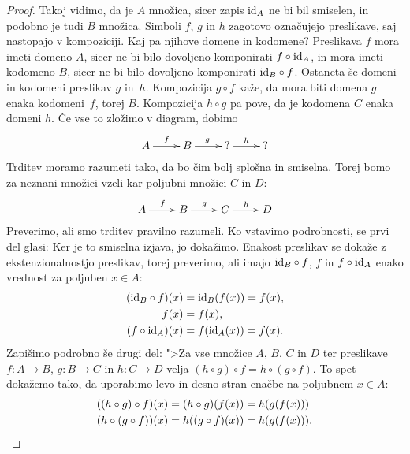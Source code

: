 \begin{proof}
  Takoj vidimo, da je $A$ množica, sicer zapis $\id[A]$ ne bi bil smiselen, in podobno je
  tudi $B$ množica. Simboli $f$, $g$ in $h$ zagotovo označujejo preslikave, saj nastopajo
  v kompoziciji. Kaj pa njihove domene in kodomene? Preslikava $f$ mora imeti domeno $A$,
  sicer ne bi bilo dovoljeno komponirati $f \circ \id[A]$, in mora imeti kodomeno $B$,
  sicer ne bi bilo dovoljeno komponirati $\id[B] \circ f$. Ostaneta še domeni in kodomeni
  preslikav $g$ in~$h$. Kompozicija $g \circ f$ kaže, da mora biti domena $g$ enaka
  kodomeni~$f$, torej $B$. Kompozicija $h \circ g$ pa pove, da je kodomena $C$ enaka
  domeni $h$. Če vse to zložimo v diagram, dobimo
  \begin{equation*}
    \xymatrix{
      {A} \ar[r]^{f}
      &
      {B} \ar[r]^{g}
      &
      {\text{?}} \ar[r]^{h}
      &
      {\text{?}}
    }
  \end{equation*}
  Trditev moramo razumeti tako, da bo čim bolj splošna in smiselna. Torej bomo za neznani
  množici vzeli kar poljubni množici $C$ in $D$:
  \begin{equation*}
    \xymatrix{
      {A} \ar[r]^{f}
      &
      {B} \ar[r]^{g}
      &
      {C} \ar[r]^{h}
      &
      {D}
    }
  \end{equation*}
  Preverimo, ali smo trditev pravilno razumeli. Ko vstavimo podrobnosti, se prvi del
  glasi: 
  Ker je to smiselna izjava, jo dokažimo. Enakost preslikav se dokaže z ekstenzionalnostjo
  preslikav, torej preverimo, ali imajo $\id[B] \circ f$, $f$ in $f \circ \id[A]$ enako
  vrednost za poljuben $x \in A$:
  \begin{align*}
    (\id[B] \circ f)(x) &= \id[B] (f (x)) = f (x), \\
    f (x) &= f(x), \\
    (f \circ \id[A])(x) &= f (\id[A](x)) = f(x).
  \end{align*}
  Zapišimo podrobno še drugi del: ">Za vse množice $A$, $B$, $C$ in $D$ ter preslikave
  $f : A \to B$, $g : B \to C$ in $h : C \to D$ velja
  $(h \circ g) \circ f = h \circ (g \circ f)$. To spet dokažemo tako, da uporabimo levo in
  desno stran enačbe na poljubnem $x \in A$:
  \begin{align*}
    ((h \circ g) \circ f)(x) &= (h \circ g)(f(x)) = h(g(f(x))) \\
    (h \circ (g \circ f))(x) &= h((g \circ f)(x)) = h(g(f(x))). \qedhere
  \end{align*}
\end{proof}


